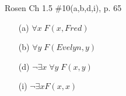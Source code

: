 \documentclass[12pt,addpoints]{exam}
\newcommand{\ra}{\rightarrow}
\begin{document}
\begin{questions}
\question[8] Rosen Ch 1.5 \#10(a,b,d,i), p. 65
    \ifprintanswers
        \vspace{-10pt}
    \fi
\begin{solution}
    \begin{itemize}[itemsep=0pt,parsep=0pt,topsep=0pt,partopsep=0pt]
        \item[(a)] $\forall x\; F(x,Fred)$
        \item[(b)] $\forall y\; F(Evelyn, y)$
        \item[(d)] $\neg \exists x\; \forall y\; F(x,y)$
        \item[(i)] $\neg \exists x F(x,x)$
    \end{itemize}
\end{solution}




\end{questions}
\end{document}
